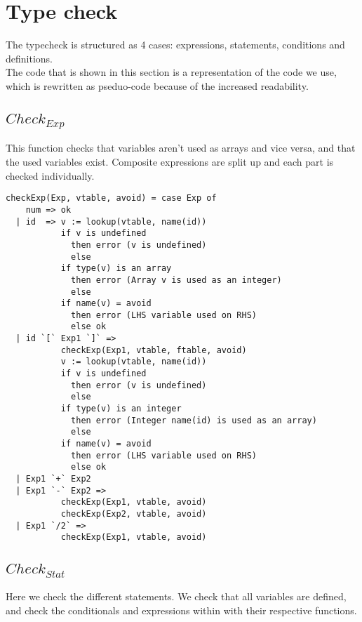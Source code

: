 \section{Type check}

The typecheck is structured as 4 cases: expressions, statements, conditions and definitions. \\
The code that is shown in this section is a representation of the code we use, 
which is rewritten as pseduo-code because of the increased readability.

\subsection{$Check_{Exp}$}

This function checks that variables aren't used as arrays and vice versa,
and that the used variables exist. Composite expressions are split up
and each part is checked individually.

\begin{verbatim}
checkExp(Exp, vtable, avoid) = case Exp of
    num => ok
  | id  => v := lookup(vtable, name(id))
           if v is undefined
             then error (v is undefined)
             else
           if type(v) is an array
             then error (Array v is used as an integer)
             else
           if name(v) = avoid
             then error (LHS variable used on RHS)
             else ok
  | id `[` Exp1 `]` =>
           checkExp(Exp1, vtable, ftable, avoid)
           v := lookup(vtable, name(id))
           if v is undefined
             then error (v is undefined)
             else
           if type(v) is an integer
             then error (Integer name(id) is used as an array)
             else
           if name(v) = avoid
             then error (LHS variable used on RHS)
             else ok
  | Exp1 `+` Exp2
  | Exp1 `-` Exp2 =>
           checkExp(Exp1, vtable, avoid)
           checkExp(Exp2, vtable, avoid)
  | Exp1 `/2` =>
           checkExp(Exp1, vtable, avoid)
\end{verbatim}

\subsection{$Check_{Stat}$}

Here we check the different statements. We check that all variables are
defined, and check the conditionals and expressions within with their
respective functions. 

